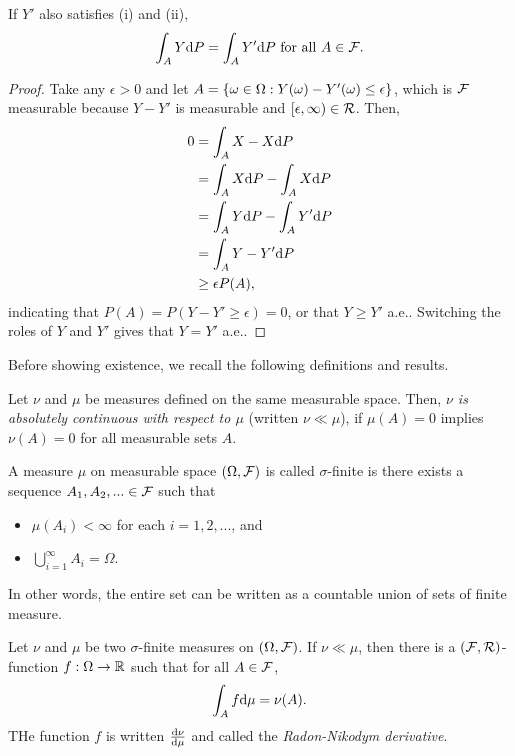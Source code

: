 \begin{lem}[Uniqueness]
    If $Y'$ also satisfies (i) and (ii),
    \begin{align*}
        \int_A Y \text{d} P = \int_A Y' \text{d} P \text{ for all } A \in \mathcal{F}.
    \end{align*}
\end{lem}
\begin{proof}
    Take any $\epsilon > 0$ and let $A = \left\{\omega \in \Omega: Y(\omega) - Y'(\omega) \leq \epsilon\right\}$, which is $\mathcal{F}$ measurable because $Y - Y'$ is measurable and $[\epsilon, \infty) \in \mathcal{R}$. Then,
    \begin{align*}
        0 &= \int_A X - X \text{d} P\\
        &= \int_A X \text{d} P - \int_A X \text{d} P\\
        &= \int_A Y \text{d} P - \int_A Y' \text{d} P\\
        &= \int_A Y -Y' \text{d} P\\
        &\geq \epsilon P(A),
    \end{align*}
    indicating that $P(A) = P(Y - Y' \geq \epsilon) = 0$, or that $Y \geq Y'$ a.e.. Switching the roles of $Y$ and $Y'$ gives that $Y = Y'$ a.e.. 
\end{proof}

Before showing existence, we recall the following definitions and results.

\begin{defi}
    Let $\nu$ and $\mu$ be measures defined on the same measurable space. Then, {\it $\nu$ is absolutely continuous with respect to $\mu$} (written $\nu \ll \mu$), if $\mu(A) = 0$ implies $\nu(A) = 0$ for all measurable sets $A$.
\end{defi}
\begin{defi}
    A measure $\mu$ on measurable space $\left(\Omega, \mathcal{F}\right)$ is called $\sigma$-finite is there exists a sequence $A_1, A_2, ... \in \mathcal{F}$ such that 
    \begin{itemize}
        \item $\mu(A_i) < \infty$ for each $i = 1, 2, ...$, and 
        \item $\bigcup_{i=1}^\infty A_i = \Omega$.
    \end{itemize}
    In other words, the entire set can be written as a countable union of sets of finite measure.
\end{defi}
\begin{thm}
    Let $\nu$ and $\mu$ be two $\sigma$-finite measures on $\left(\Omega, \mathcal{F}\right)$. If $\nu \ll \mu$, then there is a $\left(\mathcal{F}, \mathcal{R}\right)$-function $f: \Omega \rightarrow \mathbb{R}$ such that for all $A \in \mathcal{F}$,
    \begin{align*}
        \int_A f \text{d} \mu = \nu(A).
    \end{align*}
    THe function $f$ is written $\frac{\text{d} \nu}{\text{d} \mu}$ and called the {\it Radon-Nikodym derivative}.
\end{thm}

